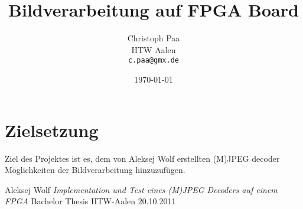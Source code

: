 \documentclass[%
  paper=A4, %
  pagesize, %
  12pt,
  ngerman   %
]{report}  %
\begin{document}
\title{Bildverarbeitung auf FPGA Board}
\author{Christoph Paa\\HTW Aalen\\
\texttt{c.paa@gmx.de}}
\date{\today}
\maketitle

\tableofcontents

\section{Zielsetzung}
Ziel des Projektes ist es, dem von Aleksej Wolf erstellten (M)JPEG decoder\cite{aleksej10} Möglichkeiten der Bildverarbeitung hinzuzufügen.



\begin{thebibliography}{99}
 Aleksej Wolf
 \emph{Implementation und Test eines (M)JPEG Decoders auf einem FPGA}
 Bachelor Thesis
 HTW-Aalen
 20.10.2011
 
\end{thebibliography}
\end{document}
